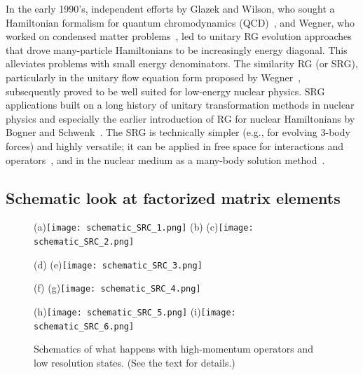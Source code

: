 \documentclass[10pt,aps,prc,floatfix,twocolumn,nofootinbib]{revtex4-1}
\begin{document}
In the early 1990's, independent efforts by Glazek and Wilson, who sought a Hamiltonian formalism for quantum chromodynamics (QCD)~\cite{Glazek:1993rc,Glazek:1994qc}, and  Wegner, who worked on condensed matter problems~\cite{Wegner:1994ab}, led to unitary RG evolution approaches that drove many-particle Hamiltonians to be increasingly energy diagonal.
This alleviates problems with small energy denominators.
The similarity RG (or SRG), particularly in the unitary flow equation form proposed by Wegner~\cite{Wegner:2001ab}, subsequently proved to be well suited for low-energy nuclear physics.
SRG applications built on a long history of unitary transformation methods in nuclear physics and especially the earlier introduction of RG for nuclear Hamiltonians by Bogner and Schwenk~\cite{Bogner:2001gq,Bogner:2001jn,Bogner:2003wn}.
The SRG is technically simpler (e.g., for evolving 3-body forces) and highly versatile; it can be applied in free space for interactions and operators~\cite{Tropiano:2020zwb}, and in the nuclear medium as a many-body solution method~\cite{Bogner:2009bt,Furnstahl:2013oba,Hergert:2020bxy}.

\subsection{Schematic look at factorized matrix elements}

\begin{figure}[ptb]
     \centering
    (a)\texttt{[image: schematic\_SRC\_1.png]}
    \quad
    (b)\!\!\!\!\!\!\!\!\!
    \quad
    (c)\texttt{[image: schematic\_SRC\_2.png]}
    
    \vspace{.2in}
    \quad
    (d)\!\!\!\!\!
    \quad
    (e)\texttt{[image: schematic\_SRC\_3.png]}
    
    \vspace{.2in}
    \quad
    (f)\!\!\!\!\!
    \quad
    (g)\texttt{[image: schematic\_SRC\_4.png]}
    
    \vspace{.2in}
    \quad\raisebox{32pt}{$\xrightarrow{\hspace*{.3in}}$}\quad
    (h)\texttt{[image: schematic\_SRC\_5.png]}
    \quad\raisebox{32pt}{$\xrightarrow{\hspace*{.3in}}$}\quad
    (i)\texttt{[image: schematic\_SRC\_6.png]}

    \caption{Schematics of what happens with high-momentum operators and low resolution states. (See the text for details.)
    }
    \label{fig:schematic_SRC_physics}

\end{figure}
\end{document}
